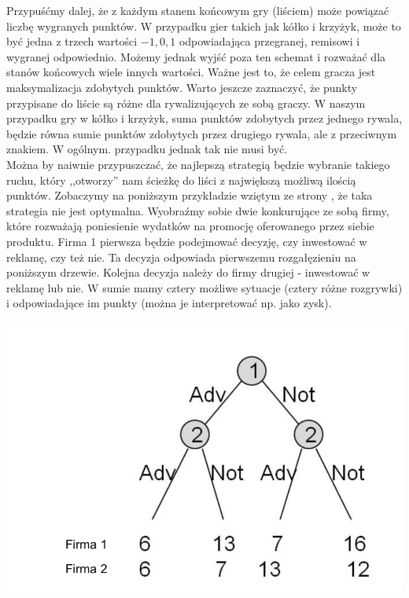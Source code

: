 \documentclass[licencjacka]{pracamgr}
\begin{document}
Przypuśćmy dalej, że z każdym stanem końcowym gry (liściem) może powiązać liczbę wygranych punktów. W przypadku gier takich jak kółko i krzyżyk, może to być jedna z trzech wartości ${-1, 0, 1}$  odpowiadająca przegranej, remisowi i wygranej odpowiednio.  Możemy jednak wyjść poza ten schemat i rozważać dla stanów końcowych wiele innych wartości.  Ważne jest to, że celem gracza jest maksymalizacja zdobytych punktów. Warto jeszcze zaznaczyć, że punkty przypisane do liście są różne dla rywalizujących ze sobą graczy. W naszym przypadku gry w kółko i krzyżyk, suma punktów zdobytych przez jednego rywala, będzie równa sumie punktów zdobytych przez drugiego rywala, ale z przeciwnym znakiem.  W ogólnym. przypadku jednak tak nie musi być. \\

 Można by naiwnie przypuszczać, że najlepszą strategią będzie wybranie takiego ruchu, który ,,otworzy'' nam ścieżkę do liści z największą możliwą ilością punktów. Zobaczymy na poniższym przykładzie wziętym ze strony \cite{Game}, że taka strategia nie jest optymalna. Wyobraźmy sobie dwie konkurujące ze sobą firmy, które rozważają poniesienie wydatków na promocję oferowanego przez siebie produktu. Firma 1 pierwsza będzie podejmować decyzję, czy inwestować w reklamę, czy też nie.  Ta decyzja odpowiada pierwszemu rozgałęzieniu na poniższym drzewie. Kolejna decyzja  należy do firmy drugiej - inwestować w reklamę lub nie. W sumie mamy cztery możliwe sytuacje (cztery różne rozgrywki) i odpowiadające im punkty (można je interpretować np. jako zysk). \\

\begin{center}
	\includegraphics [scale=0.30] {advertise.png}
\end{center}
 
\end{document}
